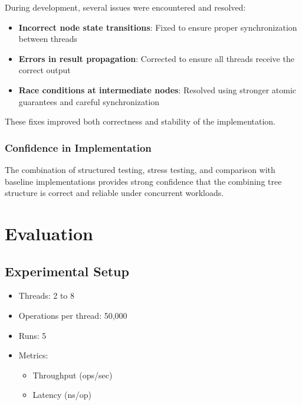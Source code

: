 \documentclass[11pt,a4paper]{article}
\begin{document}
During development, several issues were encountered and resolved:

\begin{itemize}
    \item \textbf{Incorrect node state transitions}: Fixed to ensure proper synchronization between threads
    \item \textbf{Errors in result propagation}: Corrected to ensure all threads receive the correct output
    \item \textbf{Race conditions at intermediate nodes}: Resolved using stronger atomic guarantees and careful synchronization
\end{itemize}
These fixes improved both correctness and stability of the implementation.

\subsubsection*{Confidence in Implementation}

The combination of structured testing, stress testing, and comparison with baseline implementations provides strong confidence that the combining tree structure is correct and reliable under concurrent workloads.

\section{Evaluation}
\label{sec:evaluation}

\subsection{Experimental Setup}

\begin{itemize}
    \item Threads: 2 to 8
    \item Operations per thread: 50{,}000
    \item Runs: 5
    \item Metrics:
    \begin{itemize}
        \item Throughput (ops/sec)
        \item Latency (ns/op)
    \end{itemize}
\end{itemize}
\end{document}

